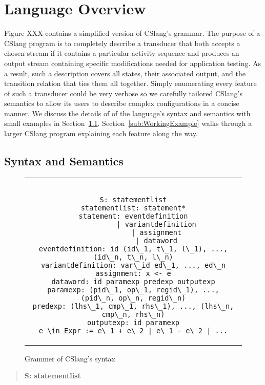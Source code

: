 \section{Language Overview}
\label{sec:Overview}

Figure XXX contains a simplified version of CSlang's grammar.  The purpose
of a CSlang program is to completely describe a transducer that both
accepts a chosen stream if it contains a particular
activity sequence and produces an output stream containing specific
modifications needed for application testing.  As a result, such a
description covers all states, their associated output, and the transition
relation that ties them all together.
Simply enumerating every feature of such a transducer could be very verbose
so we carefully tailored CSlang's semantics to allow its users to
describe complex configurations in a concise manner.
We discuss the details of of the
language's syntax and semantics with small examples in
Section~\ref{sub:SyntaxAndSemantics}.  Section~\ref{sub:WorkingExample} walks through a
larger CSlang program explaining each feature along the way.

\subsection{Syntax and Semantics}
\label{sub:SyntaxAndSemantics}

\begin{figure}[H]
\centering
\begin{tabular}{c}
\begin{lstlisting}

S: statementlist
statementlist: statement*
statement: eventdefinition
           | variantdefinition
           | assignment
           | dataword
eventdefinition: id (id\_1, t\_1, l\_1), ..., (id\_n, t\_n, l\_n)
variantdefinition: var\_id ed\_1, ..., ed\_n
assignment: x <- e
dataword: id paramexp predexp outputexp
paramexp: (pid\_1, op\_1, regid\_1), ..., (pid\_n, op\_n, regid\_n)
predexp: (lhs\_1, cmp\_1, rhs\_1), ..., (lhs\_n, cmp\_n, rhs\_n)
outputexp: id paramexp
e \in Expr := e\_1 + e\_2 | e\_1 - e\_2 | ...
\end{lstlisting}
\end{tabular}
\caption{Grammer of CSlang's syntax}
\label{lst:SyntaxGrammar}
\end{figure}


\begin{quote}
\centering
\textbf{S: statementlist}
\end{quote}


